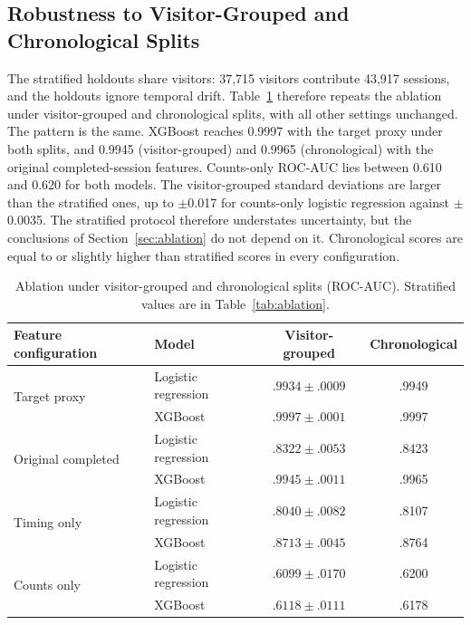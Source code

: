 \documentclass[conference, letterpaper]{IEEEtran}
\begin{document}
\subsection{Robustness to Visitor-Grouped and Chronological Splits}
\label{sec:splits}
The stratified holdouts share visitors: 37,715 visitors contribute 43,917 sessions, and the holdouts ignore temporal drift. Table~\ref{tab:splits} therefore repeats the ablation under visitor-grouped and chronological splits, with all other settings unchanged. The pattern is the same. XGBoost reaches 0.9997 with the target proxy under both splits, and 0.9945 (visitor-grouped) and 0.9965 (chronological) with the original completed-session features. Counts-only ROC-AUC lies between 0.610 and 0.620 for both models. The visitor-grouped standard deviations are larger than the stratified ones, up to $\pm$0.017 for counts-only logistic regression against $\pm$0.0035. The stratified protocol therefore understates uncertainty, but the conclusions of Section~\ref{sec:ablation} do not depend on it. Chronological scores are equal to or slightly higher than stratified scores in every configuration.

\begin{table}[t]
\caption{Ablation under visitor-grouped and chronological splits (ROC-AUC). Stratified values are in Table~\ref{tab:ablation}.}
\label{tab:splits}
\centering
\scriptsize
\begin{tabular}{llcc}
\toprule
Feature configuration & Model & Visitor-grouped & Chronological \\
\midrule
\multirow{2}{*}{Target proxy}
 & Logistic regression & $.9934\pm.0009$ & .9949 \\
 & XGBoost & $.9997\pm.0001$ & .9997 \\
\midrule
\multirow{2}{*}{Original completed}
 & Logistic regression & $.8322\pm.0053$ & .8423 \\
 & XGBoost & $.9945\pm.0011$ & .9965 \\
\midrule
\multirow{2}{*}{Timing only}
 & Logistic regression & $.8040\pm.0082$ & .8107 \\
 & XGBoost & $.8713\pm.0045$ & .8764 \\
\midrule
\multirow{2}{*}{Counts only}
 & Logistic regression & $.6099\pm.0170$ & .6200 \\
 & XGBoost & $.6118\pm.0111$ & .6178 \\
\bottomrule
\end{tabular}
\end{table}
\end{document}
